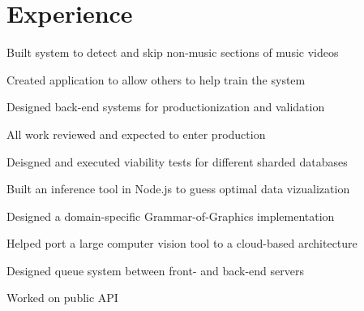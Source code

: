 \documentclass[]{deedy-resume-openfont}
\begin{document}
\begin{minipage}[t]{0.66\textwidth} 


\section{Experience}

\vspace{\topsep} %
\begin{tightemize}
\item Built system to detect and skip non-music sections of music videos
\item Created application to allow others to help train the system
\item Designed back-end systems for productionization and validation
\item All work reviewed and expected to enter production
\end{tightemize}
\sectionsep

\begin{tightemize}
\item Deisgned and executed viability tests for different sharded databases
\item Built an inference tool in Node.js to guess optimal data vizualization
\item Designed a domain-specific Grammar-of-Graphics implementation
\end{tightemize}
\sectionsep

\begin{tightemize}
\item Helped port a large computer vision tool to a cloud-based architecture
\item Designed queue system between front- and back-end servers
\item Worked on public API
\end{tightemize}



\end{minipage}
\end{document}
